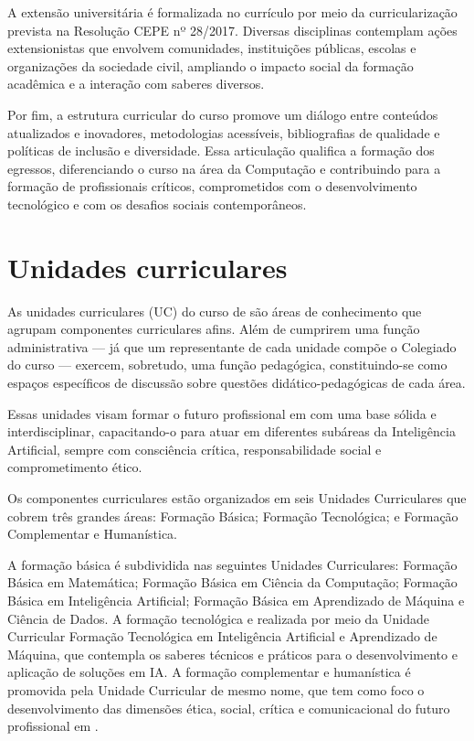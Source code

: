 A extensão universitária é formalizada no currículo por meio da curricularização prevista na Resolução CEPE nº 28/2017. Diversas disciplinas contemplam ações extensionistas que envolvem comunidades, instituições públicas, escolas e organizações da sociedade civil, ampliando o impacto social da formação acadêmica e a interação com saberes diversos.

Por fim, a estrutura curricular do curso promove um diálogo entre conteúdos atualizados e inovadores, metodologias acessíveis, bibliografias de qualidade e políticas de inclusão e diversidade. Essa articulação qualifica a formação dos egressos, diferenciando o curso na área da Computação e contribuindo para a formação de profissionais críticos, comprometidos com o desenvolvimento tecnológico e com os desafios sociais contemporâneos.


\section{Unidades curriculares}
\label{sec:unidades-curriculares}

As unidades curriculares (UC) do curso de \nomedocurso são áreas de conhecimento que agrupam componentes curriculares afins. Além de cumprirem uma função administrativa — já que um representante de cada unidade compõe o Colegiado do curso — exercem, sobretudo, uma função pedagógica, constituindo-se como espaços específicos de discussão sobre questões didático-pedagógicas de cada área.

Essas unidades visam formar o futuro profissional em \nomedocurso com uma base sólida e interdisciplinar, capacitando-o para atuar em diferentes subáreas da Inteligência Artificial, sempre com consciência crítica, responsabilidade social e comprometimento ético.

Os componentes curriculares estão organizados em seis Unidades Curriculares que cobrem três grandes áreas: Formação Básica; Formação Tecnológica; e Formação Complementar e Humanística.

A formação básica é subdividida nas seguintes Unidades Curriculares: Formação Básica em Matemática; Formação Básica em Ciência da Computação; Formação Básica em Inteligência Artificial; Formação Básica em Aprendizado de Máquina e Ciência de Dados. 
%
A formação tecnológica e realizada por meio da Unidade Curricular Formação Tecnológica em Inteligência Artificial e Aprendizado de Máquina, que contempla os saberes técnicos e práticos para o desenvolvimento e aplicação de soluções em IA. 
%
A formação complementar e humanística é promovida pela Unidade Curricular de mesmo nome, que tem como foco o desenvolvimento das dimensões ética, social, crítica e comunicacional do futuro profissional em \nomedocurso.

